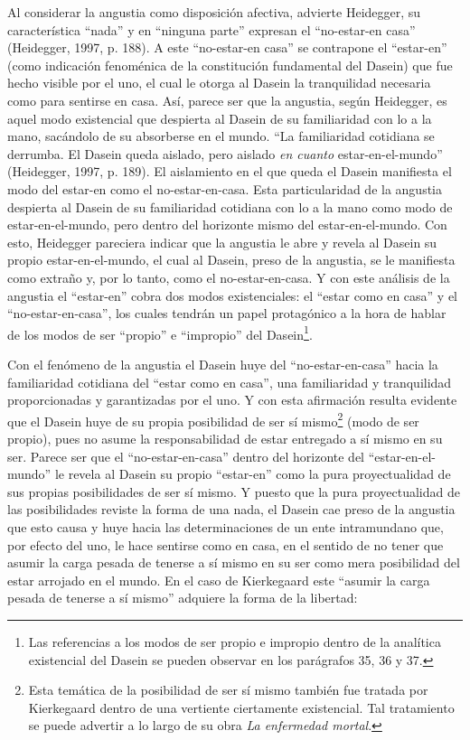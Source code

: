 \begin{refsection}
Al considerar la angustia como disposición afectiva, advierte Heidegger, su característica ``nada'' y en ``ninguna parte'' expresan el ``no-estar-en casa'' (Heidegger, 1997, p. 188). A este ``no-estar-en casa'' se contrapone el ``estar-en'' (como indicación fenoménica de la constitución fundamental del Dasein) que fue hecho visible por el uno, el cual le otorga al Dasein la tranquilidad necesaria como para sentirse en casa. Así, parece ser que la angustia, según Heidegger, es aquel modo existencial que despierta al Dasein de su familiaridad con lo a la mano, sacándolo de su absorberse en el mundo. ``La familiaridad cotidiana se derrumba. El Dasein queda aislado, pero aislado \emph{en cuanto} estar-en-el-mundo'' (Heidegger, 1997, p. 189). El aislamiento en el que queda el Dasein manifiesta el modo del estar-en como el no-estar-en-casa. Esta particularidad de la angustia despierta al Dasein de su familiaridad cotidiana con lo a la mano como modo de estar-en-el-mundo, pero dentro del horizonte mismo del estar-en-el-mundo. Con esto, Heidegger pareciera indicar que la angustia le abre y revela al Dasein su propio estar-en-el-mundo, el cual al Dasein, preso de la angustia, se le manifiesta como extraño y, por lo tanto, como el no-estar-en-casa. Y con este análisis de la angustia el ``estar-en'' cobra dos modos existenciales: el ``estar como en casa'' y el ``no-estar-en-casa'', los cuales tendrán un papel protagónico a la hora de hablar de los modos de ser ``propio'' e ``impropio'' del Dasein\footnote{Las referencias a los modos de ser propio e impropio dentro de la analítica existencial del Dasein se pueden observar en los parágrafos 35, 36 y 37.}.

Con el fenómeno de la angustia el Dasein huye del ``no-estar-en-casa'' hacia la familiaridad cotidiana del ``estar como en casa'', una familiaridad y tranquilidad proporcionadas y garantizadas por el uno. Y con esta afirmación resulta evidente que el Dasein huye de su propia posibilidad de ser sí mismo\footnote{Esta temática de la posibilidad de ser sí mismo también fue tratada por Kierkegaard dentro de una vertiente ciertamente existencial. Tal tratamiento se puede advertir a lo largo de su obra \emph{La enfermedad mortal}.} (modo de ser propio), pues no asume la responsabilidad de estar entregado a sí mismo en su ser. Parece ser que el ``no-estar-en-casa'' dentro del horizonte del ``estar-en-el-mundo'' le revela al Dasein su propio ``estar-en'' como la pura proyectualidad de sus propias posibilidades de ser sí mismo. Y puesto que la pura proyectualidad de las posibilidades reviste la forma de una nada, el Dasein cae preso de la angustia que esto causa y huye hacia las determinaciones de un ente intramundano que, por efecto del uno, le hace sentirse como en casa, en el sentido de no tener que asumir la carga pesada de tenerse a sí mismo en su ser como mera posibilidad del estar arrojado en el mundo. En el caso de Kierkegaard este ``asumir la carga pesada de tenerse a sí mismo'' adquiere la forma de la libertad:


\end{refsection}
